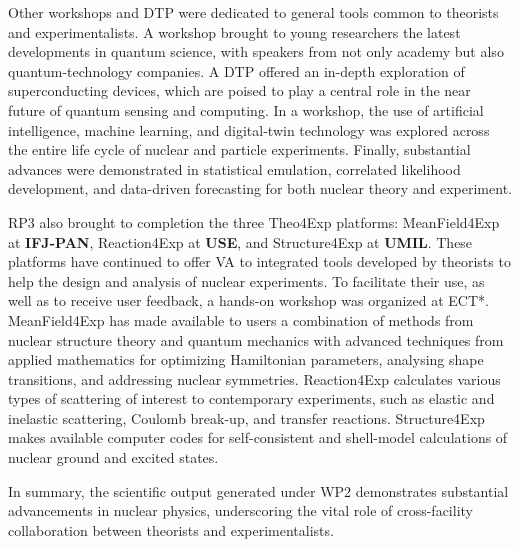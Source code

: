 Other workshops and DTP were dedicated to general tools common to theorists and experimentalists. A workshop brought to young researchers the latest developments in quantum science, with speakers from not only academy but also quantum-technology companies. A DTP offered an in-depth exploration of superconducting devices, which are poised to play a central role in the near future of quantum sensing and computing. In a workshop, the use of artificial intelligence, machine learning, and digital-twin technology was explored across the entire life cycle of nuclear and particle experiments. Finally, substantial advances were demonstrated in statistical emulation, correlated likelihood development, and data-driven forecasting for both nuclear theory and experiment.

RP3 also brought to completion the three Theo4Exp platforms: MeanField4Exp at {\bf IFJ-PAN}, Reaction4Exp at {\bf USE}, and Structure4Exp at {\bf UMIL}. These platforms have continued to offer VA to integrated tools developed by theorists to help the design and analysis of nuclear experiments. To facilitate their use, as well as to receive user feedback, a hands-on workshop was organized at ECT*. MeanField4Exp has made available to users a combination of methods from nuclear structure theory and quantum mechanics with advanced techniques from applied mathematics for optimizing Hamiltonian parameters, analysing shape transitions, and addressing nuclear symmetries. Reaction4Exp calculates various types of scattering of interest to contemporary experiments, such as elastic and inelastic scattering, Coulomb break-up, and transfer reactions. Structure4Exp makes available computer codes for self-consistent and shell-model calculations of nuclear ground and excited states. 


In summary, the scientific output generated under WP2 demonstrates substantial advancements in nuclear physics, underscoring the vital role of cross-facility collaboration between theorists and experimentalists.

